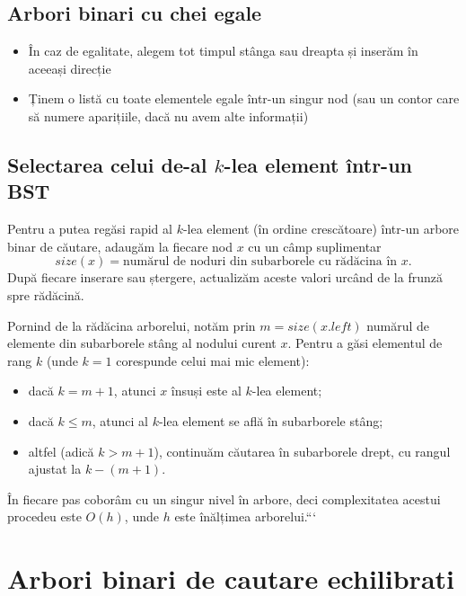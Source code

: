 \documentclass[11pt,a4paper]{article}
\theoremstyle{definition}
\theoremstyle{plain}
\theoremstyle{remark}
\begin{document}
\subsection{Arbori binari cu chei egale}

\begin{itemize}
  \item În caz de egalitate, alegem tot timpul stânga sau dreapta și inserăm în aceeași
direcție
  \item Ținem o listă cu toate elementele egale într-un singur nod (sau un contor care să
numere aparițiile, dacă nu avem alte informații)
\end{itemize}

\subsection{Selectarea celui de-al \(k\)-lea element într-un BST}

Pentru a putea regăsi rapid al \(k\)-lea element (în ordine crescătoare) într-un arbore binar de căutare, adaugăm la fiecare nod \(x\) cu un câmp suplimentar
\[
\mathit{size}(x) = \text{numărul de noduri din subarborele cu rădăcina în }x.
\]
După fiecare inserare sau ștergere, actualizăm aceste valori urcând de la frunză spre rădăcină.

Pornind de la rădăcina arborelui, notăm prin \(m = \mathit{size}(x.\mathit{left})\) numărul de elemente din subarborele stâng al nodului curent \(x\). Pentru a găsi elementul de rang \(k\) (unde \(k=1\) corespunde celui mai mic element):

\begin{itemize}
  \item dacă \(k = m + 1\), atunci \(x\) însuși este al \(k\)-lea element;
  \item dacă \(k \le m\), atunci al \(k\)-lea element se află în subarborele stâng;
  \item altfel (adică \(k > m + 1\)), continuăm căutarea în subarborele drept, cu rangul ajustat la \(k - (m + 1)\).
\end{itemize}

În fiecare pas coborâm cu un singur nivel în arbore, deci complexitatea acestui procedeu este \(O(h)\), unde \(h\) este înălțimea arborelui.```



\section{Arbori binari de cautare echilibrati}
\end{document}
